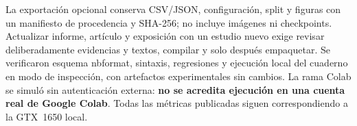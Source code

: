 La exportación opcional conserva CSV/JSON, configuración, split y figuras con un manifiesto de procedencia y SHA-256; no incluye imágenes ni checkpoints. Actualizar informe, artículo y exposición con un estudio nuevo exige revisar deliberadamente evidencias y textos, compilar y solo después empaquetar. Se verificaron esquema nbformat, sintaxis, regresiones y ejecución local del cuaderno en modo de inspección, con artefactos experimentales sin cambios. La rama Colab se simuló sin autenticación externa: \textbf{no se acredita ejecución en una cuenta real de Google Colab}. Todas las métricas publicadas siguen correspondiendo a la GTX~1650 local.
